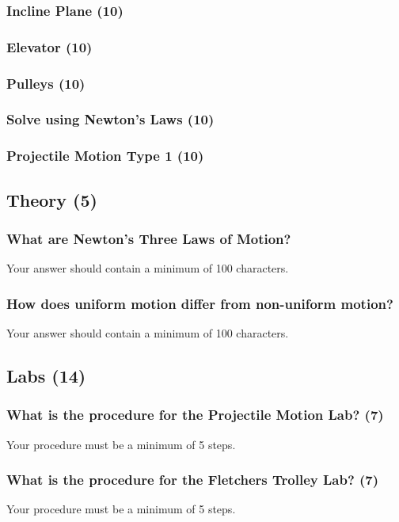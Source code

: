 \documentclass{article}
\begin{document}
\subsubsection{Incline Plane (10)}
\subsubsection{Elevator (10)}
\subsubsection{Pulleys (10)}
\subsubsection{Solve using Newton's Laws (10)}
\subsubsection{Projectile Motion Type 1 (10)}

\subsection{Theory (5)}
\subsubsection{What are Newton's Three Laws of Motion?}
Your answer should contain a minimum of 100 characters.

\subsubsection{How does uniform motion differ from non-uniform motion?}
Your answer should contain a minimum of 100 characters.

\subsection{Labs (14)}
\subsubsection{What is the procedure for the Projectile Motion Lab? (7)}
Your procedure must be a minimum of 5 steps.
\subsubsection{What is the procedure for the Fletchers Trolley Lab? (7)}
Your procedure must be a minimum of 5 steps.\\
\end{document}
